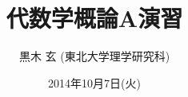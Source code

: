 \documentclass[12pt,twoside]{jarticle}
\begin{document}

\title{\bfseries 代数学概論A演習}

\author{黒木 玄 \quad (東北大学理学研究科)}

\date{2014年10月7日(火)}

\maketitle

\setcounter{page}{1}       %
\setcounter{theorem}{0}    %
\setcounter{question}{0}   %
\setcounter{footnote}{0}   %

\end{document}
